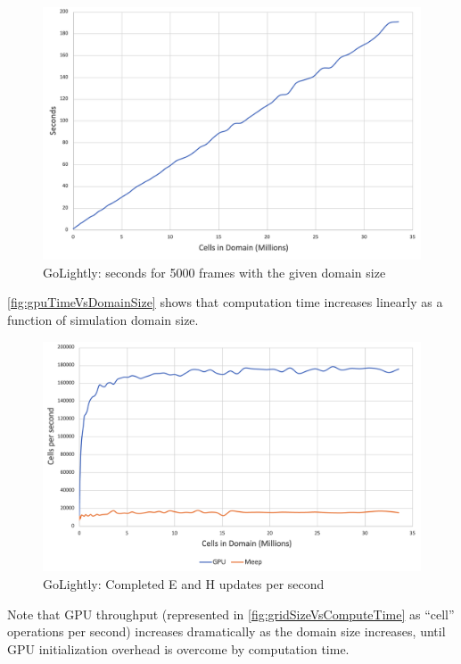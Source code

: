 \begin{figure}[H]
	\centering
	\includegraphics[width=\textwidth,
	keepaspectratio]{gpu_seconds_vs_domain_size.png}
	\caption{GoLightly: seconds for 5000 frames with the given domain size}
	\label{fig:gpuTimeVsDomainSize}
\end{figure}

\autoref{fig:gpuTimeVsDomainSize} shows that computation time increases linearly as a function of simulation domain size.


\begin{figure}[H]
	\centering
	\includegraphics[width=\textwidth,
	keepaspectratio]{cells-per-second.png}
	\caption{GoLightly: Completed E and H updates per second}
	\label{fig:gridSizeVsComputeTime}
\end{figure}

Note that GPU throughput (represented in \autoref{fig:gridSizeVsComputeTime} as “cell” operations per second) increases dramatically as the domain size increases, until GPU initialization overhead is overcome by computation time.


